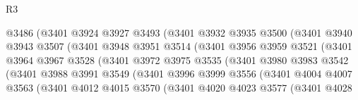 \begin{lexlean}{R3}
\begin{coremodule}
                            @3486
                            (@3401
                              @3924
                              @3927
                              @3493
                              (@3401
                                @3932
                                @3935
                                @3500
                                (@3401
                                  @3940
                                  @3943
                                  @3507
                                  (@3401
                                    @3948
                                    @3951
                                    @3514
                                    (@3401
                                      @3956
                                      @3959
                                      @3521
                                      (@3401
                                        @3964
                                        @3967
                                        @3528
                                        (@3401
                                          @3972
                                          @3975
                                          @3535
                                          (@3401
                                            @3980
                                            @3983
                                            @3542
                                            (@3401
                                              @3988
                                              @3991
                                              @3549
                                              (@3401
                                                @3996
                                                @3999
                                                @3556
                                                (@3401
                                                  @4004
                                                  @4007
                                                  @3563
                                                  (@3401
                                                    @4012
                                                    @4015
                                                    @3570
                                                    (@3401
                                                      @4020
                                                      @4023
                                                      @3577
                                                      (@3401
                                                        @4028

\end{coremodule}
\end{lexlean}
